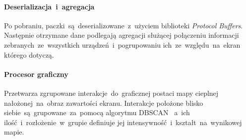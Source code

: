 \paragraph{Deserializacja~i~agregacja}
Po pobraniu, paczki~są~deserializowane~z~użyciem biblioteki {\it Protocol Buffers}. Następnie otrzymane dane podlegają agregacji służącej połączeniu informacji zebranych~ze~wszystkich urządzeń~i~pogrupowaniu ich~ze~względu~na~ekran którego dotyczą.

\paragraph{Procesor graficzny} 
\label{par:rs_graphical_processor}
Przetwarza zgrupowane interakcje~do~graficznej postaci mapy cieplnej nałożonej~na~obraz zawartości ekranu. Interakcje położone blisko siebie~są~grupowane~za~pomocą algorytmu DBSCAN \cite{DBSCAN_Wiki}~a~ich ilość~i~rozłożenie~w~grupie definiuje jej intensywność~i~kształt~na~wynikowej mapie.
